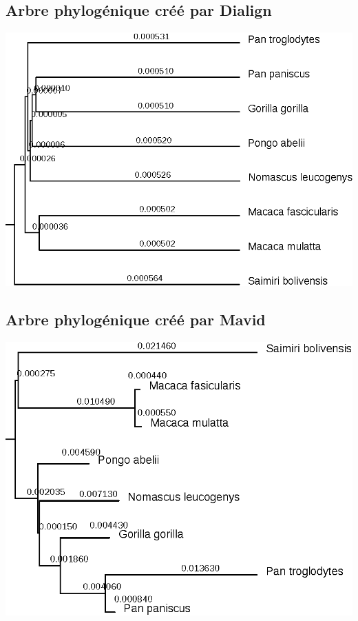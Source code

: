 \documentclass[11pt]{article} %
\begin{document}
\subsection{Arbre phylogénique créé par Dialign}\label{21}
\includegraphics{annexes/q4_cds/dialign/foxp4_ortho.eps}

\subsection{Arbre phylogénique créé par Mavid}\label{22}
\includegraphics{annexes/q4_cds/Mavid/mavid.eps}
\end{document}
